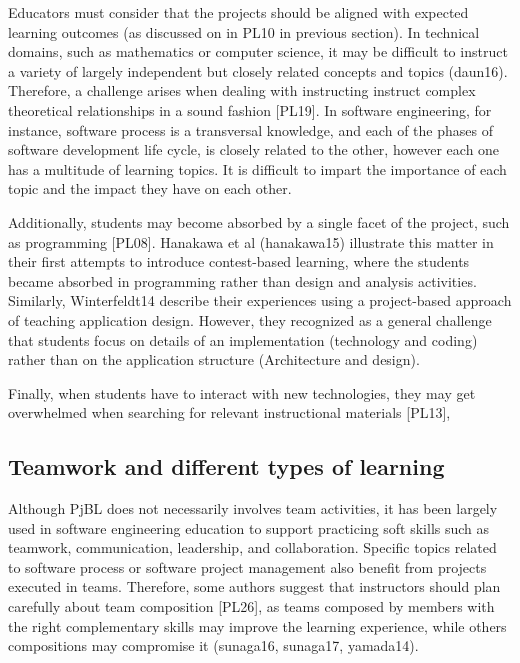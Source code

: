 Educators must consider that the projects should be aligned with expected learning outcomes (as discussed on in PL10 in previous section). In technical domains, such as mathematics or computer science, it may be difficult to instruct a variety of largely independent but closely related concepts and topics (daun16). Therefore, a challenge arises when dealing with instructing instruct complex theoretical relationships in a sound fashion [PL19]. In software engineering, for instance, software process is a transversal knowledge, and each of the phases of software development life cycle, is closely related to the other, however each one has a multitude of learning topics. It is difficult to impart the importance of each topic and the impact they have on each other.

Additionally, students may become absorbed by a single facet of the project, such as programming [PL08]. Hanakawa et al (hanakawa15) illustrate this matter in their first attempts to introduce contest-based learning, where the students became absorbed in programming rather than design and analysis activities. Similarly, Winterfeldt14 describe their experiences using a project-based approach of teaching application design. However, they recognized as a general challenge that students focus on details of an implementation (technology and coding) rather than on the application structure (Architecture and design).

Finally, when students have to interact with new technologies, they may get overwhelmed when searching for relevant instructional materials [PL13], 


\subsection{Teamwork and different types of learning}

Although PjBL does not necessarily involves team activities, it has been largely used in software engineering education to support practicing soft skills such as teamwork, communication, leadership, and collaboration. Specific topics related to software process or software project management also benefit from projects executed in teams. Therefore, some authors suggest that instructors should plan carefully about team composition [PL26], as teams composed by members with the right complementary skills may improve the learning experience, while others compositions may compromise it (sunaga16, sunaga17, yamada14).

